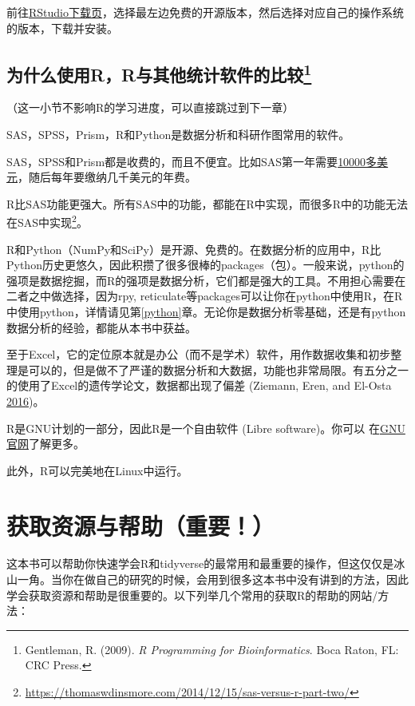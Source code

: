 \documentclass[]{book}
\let\rmarkdownfootnote\footnote%
\def\footnote{\protect\rmarkdownfootnote}
\begin{document}
前往\href{https://www.rstudio.com/products/rstudio/download/}{RStudio下载页}，选择最左边免费的开源版本，然后选择对应自己的操作系统的版本，下载并安装。

\hypertarget{youshi}{%
\section[为什么使用R，R与其他统计软件的比较]{\texorpdfstring{为什么使用R，R与其他统计软件的比较\footnote{Gentleman, R. (2009). \emph{R Programming for Bioinformatics}. Boca Raton, FL: CRC Press.}}{为什么使用R，R与其他统计软件的比较}}\label{youshi}}

（这一小节不影响R的学习进度，可以直接跳过到下一章）

SAS，SPSS，Prism，R和Python是数据分析和科研作图常用的软件。

SAS，SPSS和Prism都是收费的，而且不便宜。比如SAS第一年需要\href{http://www.sas.com/store/products-solutions/cSoftware-p1.html}{10000多美元}，随后每年要缴纳几千美元的年费。

R比SAS功能更强大。所有SAS中的功能，都能在R中实现，而很多R中的功能无法在SAS中实现\footnote{\url{https://thomaswdinsmore.com/2014/12/15/sas-versus-r-part-two/}}。

R和Python（NumPy和SciPy）是开源、免费的。在数据分析的应用中，R比Python历史更悠久，因此积攒了很多很棒的packages（包）。一般来说，python的强项是数据挖掘，而R的强项是数据分析，它们都是强大的工具。不用担心需要在二者之中做选择，因为rpy, reticulate等packages可以让你在python中使用R，在R中使用python，详情请见第\ref{python}章。无论你是数据分析零基础，还是有python数据分析的经验，都能从本书中获益。

至于Excel，它的定位原本就是办公（而不是学术）软件，用作数据收集和初步整理是可以的，但是做不了严谨的数据分析和大数据，功能也非常局限。有五分之一的使用了Excel的遗传学论文，数据都出现了偏差 (Ziemann, Eren, and El-Osta \protect\hyperlink{ref-Ziemann2016Gene-name-errors}{2016})。

R是GNU计划的一部分，因此R是一个自由软件 (Libre software)。你可以 在\href{https://www.gnu.org/philosophy/free-sw.zh-cn.html}{GNU官网}了解更多。

此外，R可以完美地在Linux中运行。

\hypertarget{getting-help}{%
\chapter{获取资源与帮助（重要！）}\label{getting-help}}

这本书可以帮助你快速学会R和tidyverse的最常用和最重要的操作，但这仅仅是冰山一角。当你在做自己的研究的时候，会用到很多这本书中没有讲到的方法，因此学会获取资源和帮助是很重要的。以下列举几个常用的获取R的帮助的网站/方法：
\end{document}
